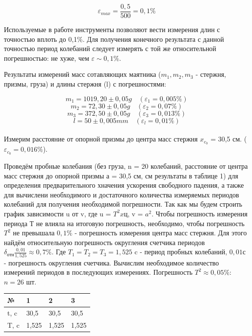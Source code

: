 \[
    \varepsilon_{max} = \frac{0,5}{500} = 0,1\% 
\]

    Используемые в работе инструменты позволяют вести измерения длин
    с точностью вплоть до 0,1\%. Для получения конечного результата с данной точностью период колебаний следует измерять с той же относительной погрешностью: не хуже, чем $\varepsilon\sim0,1\%$.
    
    Результаты измерений масс сотавляющих маятника ($m_{1}, m_{2}, m_{3}$ - стержня, призмы, груза) и длины стержня (l) с погрешностями:
    
\[
    m_{1} = 1019,20 \pm 0,05 g  \quad  (\varepsilon_{1} = 0,005\%)
\]
\[
    m_{2} = 72,30 \pm 0,05 g  \quad   (\varepsilon_{2} = 0,07\%)
\]
\[
    m_{3} = 372,50 \pm 0,05 g  \quad   (\varepsilon_{3} = 0,013\%)
\]
\[
    l  = 50 \pm 0,005 mm  \quad   (\varepsilon_l = 0,01\%)
\]\\

    Измерим расстояние от опорной призмы до центра масс стержня $x_{c_0}$ = 30,5 см. ($\varepsilon_{c_0} = 0,016\%$).
    
    Проведём пробные колебания (без груза, n = 20 колебаний, расстояние от центра масс стержня до опорной призмы а = 30,5 см, см результаты в таблице 1) для определения предварительного хначения ускорения свободного падения, а также для вычислени необходимого и достаточного количества измеряемых периодов колебаний для получения необходимой погрешности. Так как мы будем строить график зависимости u от v, где u = $T^2xц$, v = $a^2$. Чтобы погрешность измерения периода Т не влияла на итоговую погрешность, необходимо, чтобы погрешность $T^2$ не превышала $0,1\%$ - погрешность измерения центра масс стержня. Для этого найдём относительную погрешность округления счетчика периодов $\delta_{отн}\frac{0,01}{1,525} \approx 0,7\%$. Где $T_1 = T_2 = T_3 = 1,525$ c - период пробных колебаний, $0,01 с$ - погрешность округления счетчика. Вычислим необходимое количество измерений периодов в последующих измерениях. Погрешность $T^2 \approx 0,05\%$: $n = 26$ шт. 

   
\begin{table}[!h]
\centering
\begin{tabular}{|l|l|l|l|}
\hline
    №    & 1    & 2    & 3    \\ \hline
    t, c & 30,5 & 30,5 & 30,5 \\ \hline
    T, c & 1,525 & 1,525 & 1,525 \\ \hline
\end{tabular}
\end{table}

